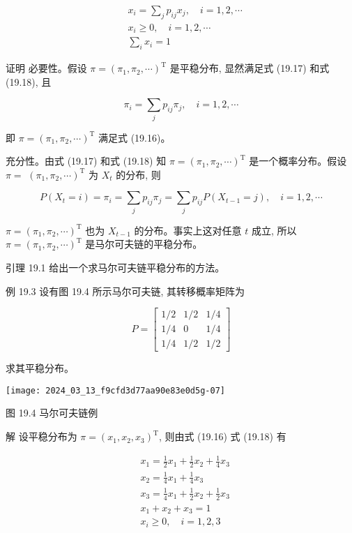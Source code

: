 \documentclass[10pt]{article}
\begin{document}
\begin{CJK*}{UTF8}{bsmi}
\begin{align*}
& x_{i}=\sum_{j} p_{i j} x_{j}, \quad i=1,2, \cdots  \tag{19.16}\\
& x_{i} \geqslant 0, \quad i=1,2, \cdots  \tag{19.17}\\
& \sum_{i} x_{i}=1 \tag{19.18}
\end{align*}


证明 必要性。假设 $\pi=\left(\pi_{1}, \pi_{2}, \cdots\right)^{\mathrm{T}}$ 是平稳分布, 显然满足式 (19.17) 和式 (19.18), 且

$$
\pi_{i}=\sum_{j} p_{i j} \pi_{j}, \quad i=1,2, \cdots
$$

即 $\pi=\left(\pi_{1}, \pi_{2}, \cdots\right)^{\mathrm{T}}$ 满足式 (19.16)。

充分性。由式 (19.17) 和式 (19.18) 知 $\pi=\left(\pi_{1}, \pi_{2}, \cdots\right)^{\mathrm{T}}$ 是一个概率分布。假设 $\pi=$ $\left(\pi_{1}, \pi_{2}, \cdots\right)^{\mathrm{T}}$ 为 $X_{t}$ 的分布, 则

$$
P\left(X_{t}=i\right)=\pi_{i}=\sum_{j} p_{i j} \pi_{j}=\sum_{j} p_{i j} P\left(X_{t-1}=j\right), \quad i=1,2, \cdots
$$

$\pi=\left(\pi_{1}, \pi_{2}, \cdots\right)^{\mathrm{T}}$ 也为 $X_{t-1}$ 的分布。事实上这对任意 $t$ 成立, 所以 $\pi=\left(\pi_{1}, \pi_{2}, \cdots\right)^{\mathrm{T}}$ 是马尔可夫链的平稳分布。

引理 19.1 给出一个求马尔可夫链平稳分布的方法。

例 19.3 设有图 19.4 所示马尔可夫链, 其转移概率矩阵为

$$
P=\left[\begin{array}{ccc}
1 / 2 & 1 / 2 & 1 / 4 \\
1 / 4 & 0 & 1 / 4 \\
1 / 4 & 1 / 2 & 1 / 2
\end{array}\right]
$$

求其平稳分布。

\begin{center}
\texttt{[image: 2024\_03\_13\_f9cfd3d77aa90e83e0d5g-07]}
\end{center}

图 19.4 马尔可夫链例

解 设平稳分布为 $\pi=\left(x_{1}, x_{2}, x_{3}\right)^{\mathrm{T}}$, 则由式 (19.16) 式 (19.18) 有

$$
\begin{aligned}
& x_{1}=\frac{1}{2} x_{1}+\frac{1}{2} x_{2}+\frac{1}{4} x_{3} \\
& x_{2}=\frac{1}{4} x_{1}+\frac{1}{4} x_{3} \\
& x_{3}=\frac{1}{4} x_{1}+\frac{1}{2} x_{2}+\frac{1}{2} x_{3} \\
& x_{1}+x_{2}+x_{3}=1 \\
& x_{i} \geqslant 0, \quad i=1,2,3
\end{aligned}
$$


\end{CJK*}
\end{document}
